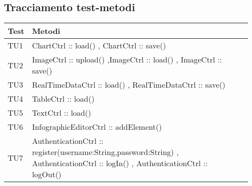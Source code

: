 \subsection{Tracciamento test-metodi}
\begin{table}[h]
	\begin{center}
	\begin{tabular}{|l|p{}|p{}|c|}
	\toprule
		\textbf{Test}  & \textbf{Metodi}\\
		
	\midrule
		TU1 & ChartCtrl :: load() , ChartCtrl :: save() \\
	\midrule
		TU2 & ImageCtrl :: upload() ,ImageCtrl :: load() , ImageCtrl :: save() \\
	\midrule
		TU3 & RealTimeDataCtrl :: load() , RealTimeDataCtrl :: save() \\
	\midrule
		TU4 & TableCtrl :: load() \\
	\midrule
		TU5 &TextCtrl :: load() \\
	\midrule
		TU6 &InfographicEditorCtrl :: addElement() \\
	\midrule
		TU7 & AuthenticationCtrl :: register(username:String,password:String) , AuthenticationCtrl :: logIn() , AuthenticationCtrl :: logOut() \\
\bottomrule
\end{tabular}
\end{center}
\end{table}

